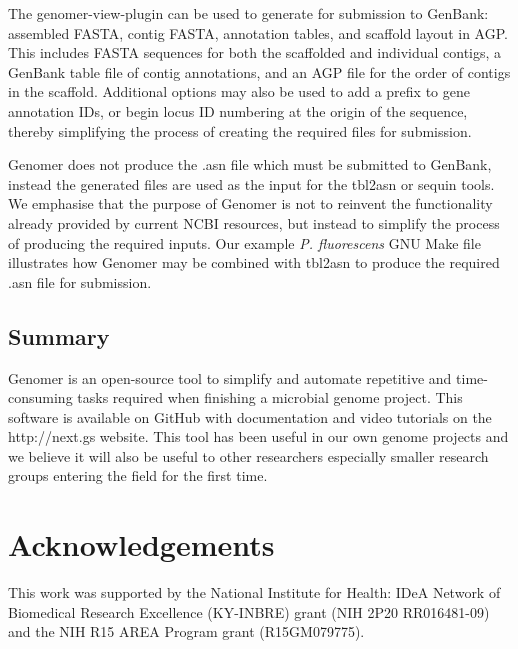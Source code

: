 \documentclass[10pt]{article}
\begin{document}
The genomer-view-plugin can be used to generate for submission to GenBank:
assembled FASTA, contig FASTA, annotation tables, and scaffold layout in AGP.
This includes FASTA sequences for both the scaffolded and individual contigs, a
GenBank table file of contig annotations, and an AGP file for the order of
contigs in the scaffold. Additional options may also be used to add a prefix to
gene annotation IDs, or begin locus ID numbering at the origin of the sequence,
thereby simplifying the process of creating the required files for submission.

Genomer does not produce the .asn file which must be submitted to GenBank,
instead the generated files are used as the input for the tbl2asn or sequin
tools. We emphasise that the purpose of Genomer is not to reinvent the
functionality already provided by current NCBI resources, but instead to
simplify the process of producing the required inputs. Our example \emph{P.
fluorescens} GNU Make file \cite{genome-github} illustrates how Genomer may be
combined with tbl2asn to produce the required .asn file for submission.

\subsection*{Summary}

Genomer is an open-source tool to simplify and automate repetitive and
time-consuming tasks required when finishing a microbial genome project. This
software is available on GitHub \cite{genomer-github} with documentation and
video tutorials on the http://next.gs website. This tool has been useful in our
own genome projects and we believe it will also be useful to other researchers
especially smaller research groups entering the field for the first time.

\section*{Acknowledgements}

This work was supported by the National Institute for Health: IDeA Network of
Biomedical Research Excellence (KY-INBRE) grant (NIH 2P20 RR016481-09) and the
NIH R15 AREA Program grant (R15GM079775).


\end{document}
